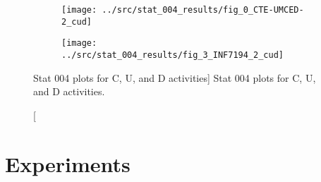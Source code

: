 \begin{figure}[h!]
    \centering

    \begin{subfigure}{.5\textwidth}
        \centering
        \texttt{[image: ../src/stat\_004\_results/fig\_0\_CTE-UMCED-2\_cud]}
        \label{subfig:stat_004_0_cud}
    \end{subfigure}%
    \begin{subfigure}{.5\textwidth}
        \centering
        \texttt{[image: ../src/stat\_004\_results/fig\_3\_INF7194\_2\_cud]}
        \label{subfig:stat_004_3_cud}
    \end{subfigure}

    \caption
        [Stat 004 plots for C, U, and D activities]
        {Stat 004 plots for C, U, and D activities.}

    \label{fig:stat_004_cud}
\end{figure}

\section{Experiments}
